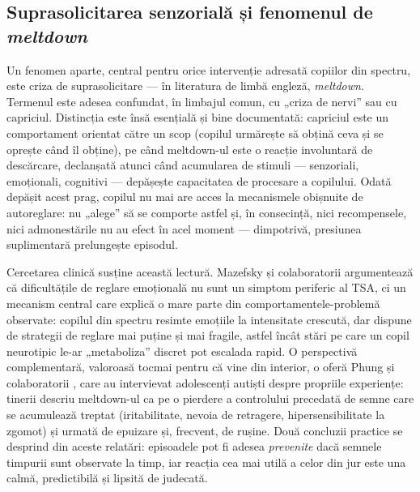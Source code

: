 \subsection{Suprasolicitarea senzorială și fenomenul de \emph{meltdown}}
\label{sec:meltdown}

Un fenomen aparte, central pentru orice intervenție adresată copiilor din spectru, este criza de suprasolicitare — în literatura de limbă engleză, \emph{meltdown}. Termenul este adesea confundat, în limbajul comun, cu „criza de nervi” sau cu capriciul. Distincția este însă esențială și bine documentată: capriciul este un comportament orientat către un scop (copilul urmărește să obțină ceva și se oprește când îl obține), pe când meltdown-ul este o reacție involuntară de descărcare, declanșată atunci când acumularea de stimuli — senzoriali, emoționali, cognitivi — depășește capacitatea de procesare a copilului. Odată depășit acest prag, copilul nu mai are acces la mecanismele obișnuite de autoreglare: nu „alege” să se comporte astfel și, în consecință, nici recompensele, nici admonestările nu au efect în acel moment — dimpotrivă, presiunea suplimentară prelungește episodul.

Cercetarea clinică susține această lectură. Mazefsky și colaboratorii \cite{mazefsky2013} argumentează că dificultățile de reglare emoțională nu sunt un simptom periferic al TSA, ci un mecanism central care explică o mare parte din comportamentele-problemă observate: copilul din spectru resimte emoțiile la intensitate crescută, dar dispune de strategii de reglare mai puține și mai fragile, astfel încât stări pe care un copil neurotipic le-ar „metaboliza” discret pot escalada rapid. O perspectivă complementară, valoroasă tocmai pentru că vine din interior, o oferă Phung și colaboratorii \cite{phung2021}, care au intervievat adolescenți autiști despre propriile experiențe: tinerii descriu meltdown-ul ca pe o pierdere a controlului precedată de semne care se acumulează treptat (iritabilitate, nevoia de retragere, hipersensibilitate la zgomot) și urmată de epuizare și, frecvent, de rușine. Două concluzii practice se desprind din aceste relatări: episoadele pot fi adesea \emph{prevenite} dacă semnele timpurii sunt observate la timp, iar reacția cea mai utilă a celor din jur este una calmă, predictibilă și lipsită de judecată.

